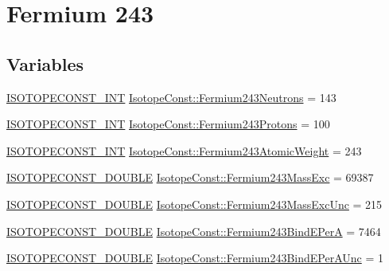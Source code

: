 \hypertarget{group___isotope_const-_fermium-_fm243}{}\section{Fermium 243}
\label{group___isotope_const-_fermium-_fm243}
\subsection*{Variables}
\begin{DoxyCompactItemize}
\item 
\mbox{\hyperlink{group___isotope_const-_macros_ga5f18360b3e99483a35c32d789e62621c}{I\+S\+O\+T\+O\+P\+E\+C\+O\+N\+S\+T\+\_\+\+I\+NT}} \mbox{\hyperlink{group___isotope_const-_fermium-_fm243_ga0f63fc5ceb89d80da57d01a28e12c9ce}{Isotope\+Const\+::\+Fermium243\+Neutrons}} = 143
\item 
\mbox{\hyperlink{group___isotope_const-_macros_ga5f18360b3e99483a35c32d789e62621c}{I\+S\+O\+T\+O\+P\+E\+C\+O\+N\+S\+T\+\_\+\+I\+NT}} \mbox{\hyperlink{group___isotope_const-_fermium-_fm243_gab51061c89d347d337eca7f9e7af6fef2}{Isotope\+Const\+::\+Fermium243\+Protons}} = 100
\item 
\mbox{\hyperlink{group___isotope_const-_macros_ga5f18360b3e99483a35c32d789e62621c}{I\+S\+O\+T\+O\+P\+E\+C\+O\+N\+S\+T\+\_\+\+I\+NT}} \mbox{\hyperlink{group___isotope_const-_fermium-_fm243_gabc66c9983beb406b394bd6bac662cec8}{Isotope\+Const\+::\+Fermium243\+Atomic\+Weight}} = 243
\item 
\mbox{\hyperlink{group___isotope_const-_macros_ga8f45a7272ce02c0b4c65c44636ed719a}{I\+S\+O\+T\+O\+P\+E\+C\+O\+N\+S\+T\+\_\+\+D\+O\+U\+B\+LE}} \mbox{\hyperlink{group___isotope_const-_fermium-_fm243_gab873b68eada1ec29dc6130f22d9ee880}{Isotope\+Const\+::\+Fermium243\+Mass\+Exc}} = 69387
\item 
\mbox{\hyperlink{group___isotope_const-_macros_ga8f45a7272ce02c0b4c65c44636ed719a}{I\+S\+O\+T\+O\+P\+E\+C\+O\+N\+S\+T\+\_\+\+D\+O\+U\+B\+LE}} \mbox{\hyperlink{group___isotope_const-_fermium-_fm243_gacf097cf5ad03689e703495b8b9659f31}{Isotope\+Const\+::\+Fermium243\+Mass\+Exc\+Unc}} = 215
\item 
\mbox{\hyperlink{group___isotope_const-_macros_ga8f45a7272ce02c0b4c65c44636ed719a}{I\+S\+O\+T\+O\+P\+E\+C\+O\+N\+S\+T\+\_\+\+D\+O\+U\+B\+LE}} \mbox{\hyperlink{group___isotope_const-_fermium-_fm243_gaa8cf7ea66f2e0a8e2f84d405c0b154a3}{Isotope\+Const\+::\+Fermium243\+Bind\+E\+PerA}} = 7464
\item 
\mbox{\hyperlink{group___isotope_const-_macros_ga8f45a7272ce02c0b4c65c44636ed719a}{I\+S\+O\+T\+O\+P\+E\+C\+O\+N\+S\+T\+\_\+\+D\+O\+U\+B\+LE}} \mbox{\hyperlink{group___isotope_const-_fermium-_fm243_ga87ded2236fa4bd6ae2368390dc46ec0b}{Isotope\+Const\+::\+Fermium243\+Bind\+E\+Per\+A\+Unc}} = 1

\end{DoxyCompactItemize}
